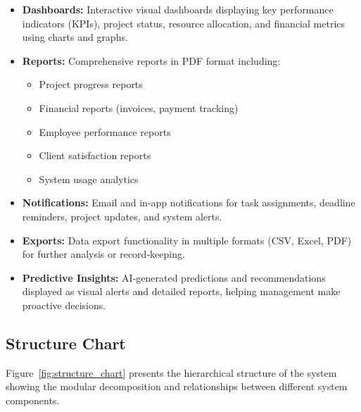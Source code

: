 \documentclass[12pt,a4paper]{article}
\begin{document}
\begin{itemize}
    \item \textbf{Dashboards:} Interactive visual dashboards displaying key performance indicators (KPIs), project status, resource allocation, and financial metrics using charts and graphs.
    
    \item \textbf{Reports:} Comprehensive reports in PDF format including:
    \begin{itemize}
        \item Project progress reports
        \item Financial reports (invoices, payment tracking)
        \item Employee performance reports
        \item Client satisfaction reports
        \item System usage analytics
    \end{itemize}
    
    \item \textbf{Notifications:} Email and in‑app notifications for task assignments, deadline reminders, project updates, and system alerts.
    
    \item \textbf{Exports:} Data export functionality in multiple formats (CSV, Excel, PDF) for further analysis or record‑keeping.
    
    \item \textbf{Predictive Insights:} AI‑generated predictions and recommendations displayed as visual alerts and detailed reports, helping management make proactive decisions.
\end{itemize}

\subsection{Structure Chart}
Figure~\ref{fig:structure_chart} presents the hierarchical structure of the system showing the modular decomposition and relationships between different system components.
\end{document}

